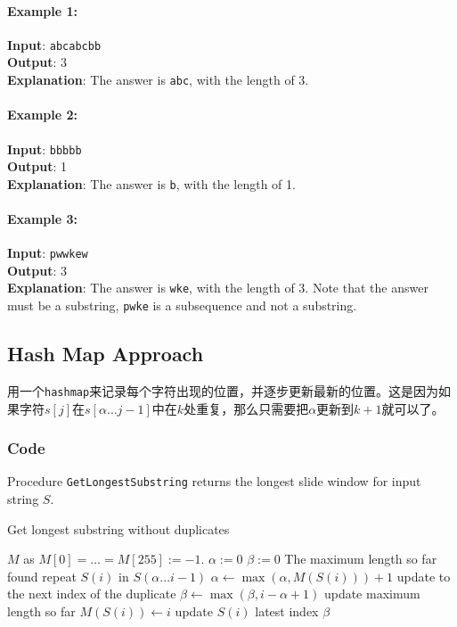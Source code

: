 \documentclass[a4paper,12pt]{article}
\begin{document}
\paragraph{Example 1:}
\begin{flushleft}
\textbf{Input}: \texttt{abcabcbb}
\\
\textbf{Output}: 3 
\\
\textbf{Explanation}: The answer is \texttt{abc}, with the length of 3. 
\end{flushleft}
\paragraph{Example 2:}
\begin{flushleft}
\textbf{Input}: \texttt{bbbbb}
\\
\textbf{Output}: 1
\\
\textbf{Explanation}: The answer is \texttt{b}, with the length of 1.
\end{flushleft}
\paragraph{Example 3:}
\begin{flushleft}
\textbf{Input}: \texttt{pwwkew}
\\
\textbf{Output}: 3
\\
\textbf{Explanation}: The answer is \texttt{wke}, with the length of 3. Note that the answer must be a substring, \texttt{pwke} is a subsequence and not a substring.
\end{flushleft}
\subsection{Hash Map Approach}
\begin{CJK*}{UTF8}{gbsn}
用一个\texttt{hashmap}来记录每个字符出现的位置，并逐步更新最新的位置。这是因为如果字符$s[j]$在$s[\alpha\ldots j-1]$中在$k$处重复，那么只需要把$\alpha$更新到$k+1$就可以了。
\end{CJK*}
\subsubsection{Code}
Procedure \texttt{GetLongestSubstring} returns the longest slide window for input string $S$.
\begin{algorithm}[H]
\caption{Get longest substring without duplicates}
\begin{algorithmic}[1]
\State $M$ as $M[0]=\ldots=M[255]:=-1$.
\State $\alpha := 0 $
\State $\beta := 0$ \Comment The maximum length so far
 \Comment found repeat $S(i)$ in $S(\alpha\ldots i-1)$
\State $\alpha \gets \max(\alpha, M(S(i))) + 1$ \Comment update to the next index of the duplicate
\EndIf
\State $\beta \gets \max(\beta, i - \alpha +1 )$ \Comment update maximum length so far
\State $M(S(i)) \gets i$ \Comment update $S(i)$ latest index
\EndFor
\State \Return $\beta$
\EndProcedure
\end{algorithmic}
\end{algorithm}
\end{document}
